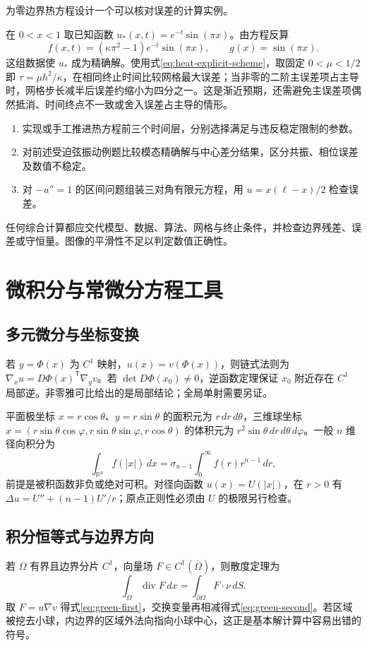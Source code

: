 \documentclass[UTF8,12pt,a4paper,fontset=fandol]{ctexbook}
\begin{document}
\begin{example}
为零边界热方程设计一个可以核对误差的计算实例。
\end{example}
\begin{solve}
在 $0<x<1$ 取已知函数 $u_*(x,t)=e^{-t}\sin(\pi x)$。由方程反算
\[
 f(x,t)=(\kappa\pi^2-1)e^{-t}\sin(\pi x),\qquad g(x)=\sin(\pi x).
\]
这组数据使 $u_*$ 成为精确解。使用式\eqref{eq:heat-explicit-scheme}，取固定 $0<\mu<1/2$ 即 $\tau=\mu h^2/\kappa$，在相同终止时间比较网格最大误差；当非零的二阶主误差项占主导时，网格步长减半后误差约缩小为四分之一。这是渐近预期，还需避免主误差项偶然抵消、时间终点不一致或舍入误差占主导的情形。
\end{solve}
\begin{enumerate}
 \item 实现或手工推进热方程前三个时间层，分别选择满足与违反稳定限制的参数。
 \item 对前述受迫弦振动例题比较模态精确解与中心差分结果，区分共振、相位误差及数值不稳定。
 \item 对 $-u''=1$ 的区间问题组装三对角有限元方程，用 $u=x(\ell-x)/2$ 检查误差。
\end{enumerate}
任何综合计算都应交代模型、数据、算法、网格与终止条件，并检查边界残差、误差或守恒量。图像的平滑性不足以判定数值正确性。

\appendix

\chapter{微积分与常微分方程工具}
\label{app:calculus}

\section{多元微分与坐标变换}
若 $y=\Phi(x)$ 为 $C^1$ 映射，$u(x)=v(\Phi(x))$，则链式法则为 $\nabla_xu=D\Phi(x)^{\mathsf T}\nabla_yv$。若 $\det D\Phi(x_0)\ne0$，逆函数定理保证 $x_0$ 附近存在 $C^1$ 局部逆。非零雅可比给出的是局部结论；全局单射需要另证。

平面极坐标 $x=r\cos\theta$、$y=r\sin\theta$ 的面积元为 $r\,dr\,d\theta$，三维球坐标 $x=(r\sin\theta\cos\varphi,r\sin\theta\sin\varphi,r\cos\theta)$ 的体积元为 $r^2\sin\theta\,dr\,d\theta\,d\varphi$。一般 $n$ 维径向积分为
\[
 \int_{\mathbb R^n}f(|x|)\,dx=\sigma_{n-1}\int_0^\infty f(r)r^{n-1}\,dr,
\]
前提是被积函数非负或绝对可积。对径向函数 $u(x)=U(|x|)$，在 $r>0$ 有 $\Delta u=U''+(n-1)U'/r$；原点正则性必须由 $U$ 的极限另行检查。

\section{积分恒等式与边界方向}
若 $\Omega$ 有界且边界分片 $C^1$，向量场 $F\in C^1(\overline\Omega)$，则散度定理为
\[
 \int_\Omega\operatorname{div}F\,dx=\int_{\partial\Omega}F\cdot\nu\,dS.
\]
取 $F=u\nabla v$ 得式\eqref{eq:green-first}，交换变量再相减得式\eqref{eq:green-second}。若区域被挖去小球，内边界的区域外法向指向小球中心，这正是基本解计算中容易出错的符号。
\end{document}
